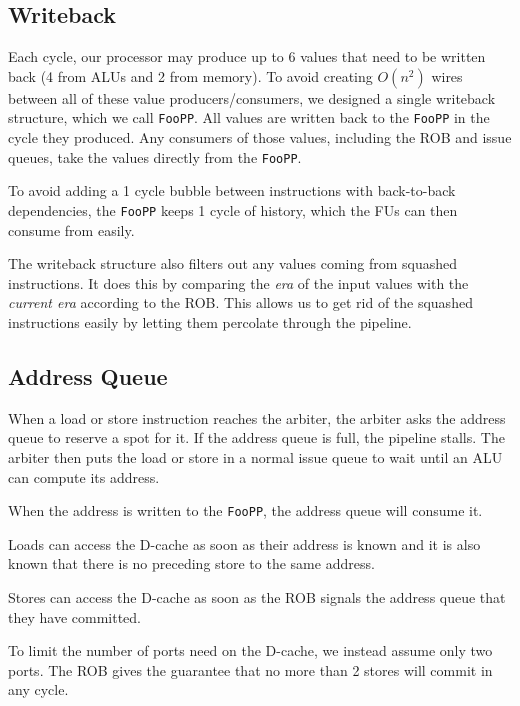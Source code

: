 \documentclass{article}
\begin{document}
\subsection{Writeback}

Each cycle, our processor may produce up to 6 values that need to be written
back (4 from ALUs and 2 from memory). To avoid creating $O(n^2)$ wires between
all of these value producers/consumers, we designed a single writeback
structure, which we call \texttt{FooPP}. All values are written back to the
\texttt{FooPP} in the cycle they produced. Any consumers of those values,
including the ROB and issue queues, take the values directly from the
\texttt{FooPP}.

To avoid adding a 1 cycle bubble between instructions with back-to-back
dependencies, the \texttt{FooPP} keeps 1 cycle of history, which the FUs can
then consume from easily.

The writeback structure also filters out any values coming from squashed
instructions. It does this by comparing the \emph{era} of the input values with
the \emph{current era} according to the ROB. This allows us to get rid of the
squashed instructions easily by letting them percolate through the pipeline.

\subsection{Address Queue}

When a load or store instruction reaches the arbiter, the arbiter asks the
address queue to reserve a spot for it. If the address queue is full, the
pipeline stalls. The arbiter then puts the load or store in a normal issue queue
to wait until an ALU can compute its address.

When the address is written to the \texttt{FooPP}, the address queue will
consume it.

Loads can access the D-cache as soon as their address is known and it is also
known that there is no preceding store to the same address.

Stores can access the D-cache as soon as the ROB signals the address queue that
they have committed.

To limit the number of ports need on the D-cache, we instead assume only two
ports. The ROB gives the guarantee that no more than 2 stores will commit in any
cycle.
\end{document}
